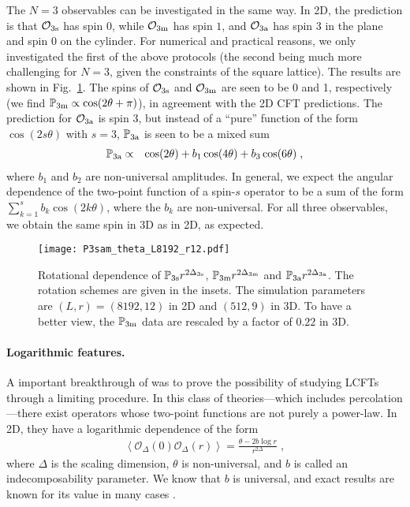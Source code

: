 \documentclass[aps,prl,twocolumn,showpacs,superscriptaddress,groupedaddress]{revtex4}  %
\def\bbp{{\mathbb P}}
\begin{document}
The $N=3$ observables can be investigated in the same way. In 2D, the prediction is that $\mathcal{O}_{3{\rm s}}$ has spin 0,
while $\mathcal{O}_{3{\rm m}}$ has spin $1$, and $\mathcal{O}_{3{\rm a}}$ has spin $3$ in the plane and spin $0$ on the cylinder.
For numerical and practical reasons, we only investigated the first of the above protocols (the second being much more challenging
for $N=3$, given the constraints of the square lattice).  The results are shown in Fig.~\ref{fig04}. The spins of $\mathcal{O}_{3{\rm s}}$ 
    and $\mathcal{O}_{3{\rm m}}$ are seen to be 0 and 1, respectively (we find $\bbp_{3{\rm m}}\propto \cos(2\theta+\pi)$), in agreement with the
2D CFT predictions. The prediction for $\mathcal{O}_{3{\rm a}}$ is spin 3, but instead of a ``pure'' function of the form $\cos(2s\theta)$ with $s=3$,
$\bbp_{3{\rm a}}$ is seen to be a mixed sum
\begin{eqnarray} 
\mathbb P_{\rm 3a} & \propto & \cos(2  \theta)+b_{1} \cos(4 \theta) + b_{3} \cos(6 \theta) \; , \nonumber 
\end{eqnarray} 
where $b_1$ and $b_2$ are non-universal amplitudes. In general, we expect the angular dependence of the two-point function of a spin-$s$ operator
to be a sum of the form $\sum_{k=1}^sb_k\cos(2k\theta)$, where the $b_k$ are non-universal. 
For all three observables, we obtain the same spin in 3D as in 2D, as expected.


\begin{figure}
\texttt{[image: P3sam\_theta\_L8192\_r12.pdf]}
\caption{Rotational dependence of $\mathbb P_{\rm 3s}r^{2\Delta_{\rm 3s}}$, $\mathbb P_{\rm 3 m}r^{2\Delta_{\rm 3m}}$
and $\mathbb P_{\rm 3a}r^{2\Delta_{\rm 3a}}$. 
The rotation schemes are given in the insets.
The simulation parameters are $(L,r)=(8192,12)$ in 2D and $(512,9)$ in 3D.
To have a better view, the  $\mathbb P_{\rm 3 m}$ data are rescaled  by a factor of $0.22$ in 3D.}
\label {fig04}
\end{figure}

\paragraph{Logarithmic features.}

A important breakthrough of \cite{VJS} was to prove the possibility of studying LCFTs through a limiting procedure.
In this class of theories---which includes percolation---there exist operators whose two-point functions are not purely a power-law.
In 2D, they have a logarithmic dependence of the form
\begin{eqnarray}
\left<\mathcal{O}_\Delta(0)\mathcal{O}_\Delta(r)\right>=\frac{\theta-2b\log r}{r^{2\Delta}} \;,
\label{logscaling}
\end{eqnarray}
where $\Delta$ is the scaling dimension, $\theta$ is non-universal, and $b$ is called an indecomposability parameter.
We know that $b$ is universal, and exact results are known for its value in many cases \cite{GurarieLudwig,VJS11,puzzle,gl21}.
\end{document}
